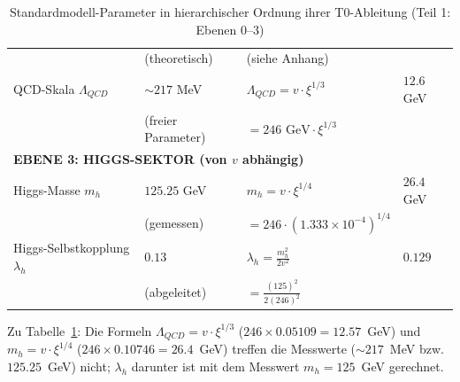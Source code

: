 \begin{table}[htbp]
{\begin{tabular}{p{4cm}p{2.5cm}p{3.5cm}p{2.7cm}}
			& (theoretisch) & (siehe Anhang) & \\[0.3em]
			QCD-Skala $\Lambda_{QCD}$ & $\sim 217$ MeV & $\Lambda_{QCD} = v \cdot \xi^{1/3}$ & $12.6$ GeV \\
			& (freier Parameter) & $= 246 \text{ GeV} \cdot \xi^{1/3}$ & \\[0.3em]
			\midrule
			\multicolumn{4}{l}{\textbf{EBENE 3: HIGGS-SEKTOR (von $v$ abhängig)}} \\
			\midrule
			Higgs-Masse $m_h$ & $125.25$ GeV & $m_h = v \cdot \xi^{1/4}$ & $26.4$ GeV \\
			& (gemessen) & $= 246 \cdot (1.333 \times 10^{-4})^{1/4}$ & \\[0.3em]
			Higgs-Selbstkopplung $\lambda_h$ & $0.13$ & $\lambda_h = \frac{m_h^2}{2v^2}$ & $0.129$ \\
			& (abgeleitet) & $= \frac{(125)^2}{2(246)^2}$ & \\[0.3em]
			\bottomrule
		\end{tabular}%
}
	\caption{Standardmodell-Parameter in hierarchischer Ordnung ihrer T0-Ableitung (Teil 1: Ebenen 0--3)}
	\label{tab:sm-params-1}
\end{table}
Zu Tabelle~\ref{tab:sm-params-1}: Die Formeln $\Lambda_{QCD} = v\cdot\xi^{1/3}$ ($246\times0.05109 = 12.57$~GeV) und $m_h = v\cdot\xi^{1/4}$ ($246\times0.10746 = 26.4$~GeV) treffen die Messwerte ($\sim 217$~MeV bzw.\ $125.25$~GeV) nicht; $\lambda_h$ darunter ist mit dem Messwert $m_h = 125$~GeV gerechnet.
